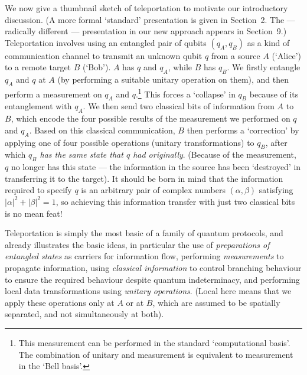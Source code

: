 \documentclass[10pt]{article}
\begin{document}
We now give a thumbnail sketch of teleportation to motivate our
introductory discussion. (A more formal `standard' presentation is
given in Section~2. The --- radically different --- presentation in our new
approach appears in Section~9.)
Teleportation involves using an entangled pair of qubits $(q_A , q_B
)$ as a kind of communication channel to transmit an unknown qubit $q$ 
from a source $A$ (`Alice') to a remote target $B$ (`Bob'). $A$ has $q$
and $q_A$, while $B$ has $q_B$. We firstly entangle $q_A$ and $q$ at
$A$ (by performing a suitable unitary operation on them), and then
perform a measurement on $q_A$ and $q$.\footnote{This measurement can be performed in the
standard `computational basis'. The combination of unitary and
measurement is equivalent to measurement in the `Bell basis'.} This forces a
`collapse' in $q_B$ because of its entanglement with $q_A$. We then
send two classical bits of information from $A$ to $B$, which encode
the four possible results of the measurement we performed on $q$ and
$q_A$. Based on this classical communication, $B$ then performs 
a `correction' by applying one of four possible operations (unitary
transformations) to $q_B$, after which \emph{$q_B$ has the same state
  that $q$ had originally}. (Because of the measurement, $q$ no longer
has this state --- the information in the source has been `destroyed' in 
transferring it to the target). It should be born in mind that the
information required to specify $q$ is an arbitrary pair of complex
numbers $(\alpha ,\beta)$ satisfying $|\alpha|^2 + |\beta|^2 = 1$, so achieving this information transfer with just two
classical bits is no mean feat!

Teleportation is simply the most basic of a family of quantum
protocols, and already illustrates the basic ideas, in particular the
use of \emph{preparations of entangled states} as carriers for information
flow, performing \emph{measurements} to propagate information, using
\emph{classical information} to control branching behaviour to ensure the
required behaviour despite quantum indeterminacy, and performing local 
data transformations using \emph{unitary operations}. (Local here means
that we apply these operations only at $A$ or at $B$, which are
assumed to be spatially separated, and not simultaneously at both).
\end{document}
